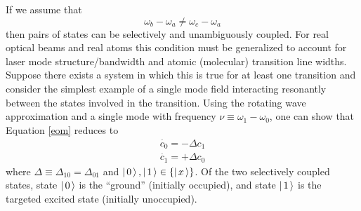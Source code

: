 \label{basic_two_level}
If we assume that
\begin{equation}
\omega_b - \omega_a
\neq
\omega_c - \omega_a
\label{condition}
\end{equation}
then pairs of states can be selectively and unambiguously coupled. For real optical beams and real atoms this condition must be generalized to account for laser mode structure/bandwidth and atomic (molecular) transition line widths. Suppose there exists a system in which this is true for at least one transition and consider the simplest example of a single mode field interacting resonantly between the states involved in the transition. Using the rotating wave approximation \cite{Zaheer:1988a} and a single mode with frequency $\nu\equiv\omega_1-\omega_0$, one can show that Equation \ref{eom} reduces to
\begin{subequations}
\begin{eqnarray}
\dot{c_0}
=
-\Delta c_1
\\
\dot{c_1}
=
+\Delta c_0
\end{eqnarray}
\label{two level eom}
\end{subequations}
where $\Delta\equiv\Delta_{10}=\Delta_{01}$ and $\left| \hspace{0.15em} 0 \hspace{0.15em}\right\rangle,\left| \hspace{0.15em} 1 \hspace{0.15em}\right\rangle\in\{\left| \hspace{0.15em} x \hspace{0.15em}\right\rangle\}$. Of the two selectively coupled states, state $\left| \hspace{0.15em} 0 \hspace{0.15em}\right\rangle$ is the ``ground''  (initially occupied), and state $\left| \hspace{0.15em} 1 \hspace{0.15em}\right\rangle$ is the targeted excited state (initially unoccupied).

